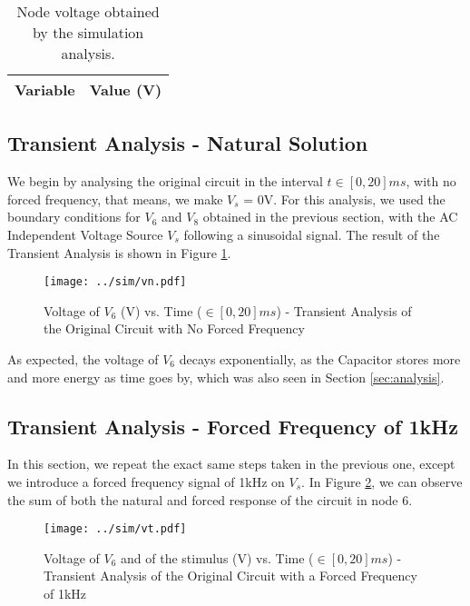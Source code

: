 \begin{table}[H]
  \centering
  \begin{tabular}{|l|r|}
    \hline
    {\bf Variable} & {\bf Value (V)} \\ \hline
    
  \end{tabular}
  \caption{Node voltage obtained by the simulation analysis.}
  \label{tab:sim2}
\end{table}

\newpage

\subsection{Transient Analysis - Natural Solution}
\label{subsec:trans_NS}

We begin by  analysing the original circuit in the interval $t \in [0, 20]ms$, with no forced frequency, that means, we make $V_s$ = 0V.
For this analysis, we used the boundary conditions for $V_6$ and $V_8$ obtained in the previous section, with the AC Independent Voltage Source $V_s$ following a sinusoidal signal. The result of the Transient Analysis is shown in Figure \ref{fig:sim-graph3}.

\begin{figure}[H] \centering
\texttt{[image: ../sim/vn.pdf]}
\caption{Voltage of $V_6$ (V) vs. Time ($\in [0, 20]ms$) - Transient Analysis of the Original Circuit with No Forced Frequency}
\label{fig:sim-graph3}
\end{figure}

As expected, the voltage of $V_6$ decays exponentially, as the Capacitor stores more and more energy as time goes by, which was also seen in Section \ref{sec:analysis}.

\subsection{Transient Analysis - Forced Frequency of 1kHz}
\label{subsec:trans_FS}

In this section, we repeat the exact same steps taken in the previous one, except we introduce a forced frequency signal of 1kHz on $V_s$. In Figure \ref{fig:sim-graph4}, we can observe the sum of both the natural and forced response of the circuit in node 6.


\begin{figure}[H] \centering
\texttt{[image: ../sim/vt.pdf]}
\caption{Voltage of $V_6$ and of the stimulus (V) vs. Time ($\in [0, 20]ms$) - Transient Analysis of the Original Circuit with a Forced Frequency of 1kHz}
\label{fig:sim-graph4}
\end{figure}


